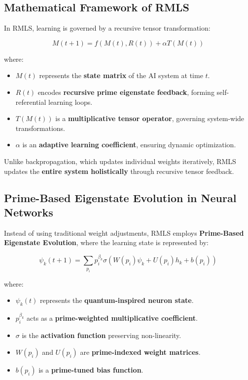 \documentclass{article}
\theoremstyle{plain}
\theoremstyle{plain}
\theoremstyle{definition}
\theoremstyle{remark}
\begin{document}
\subsection{Mathematical Framework of RMLS}

In RMLS, learning is governed by a recursive tensor transformation:

\begin{equation}
M(t+1) = f(M(t), R(t)) + \alpha T(M(t))
\end{equation}

where:
\begin{itemize}
    \item $M(t)$ represents the \textbf{state matrix} of the AI system at time $t$.
    \item $R(t)$ encodes \textbf{recursive prime eigenstate feedback}, forming self-referential learning loops.
    \item $T(M(t))$ is a \textbf{multiplicative tensor operator}, governing system-wide transformations.
    \item $\alpha$ is an \textbf{adaptive learning coefficient}, ensuring dynamic optimization.
\end{itemize}

Unlike backpropagation, which updates individual weights iteratively, RMLS updates the \textbf{entire system holistically} through recursive tensor feedback.

\subsection{Prime-Based Eigenstate Evolution in Neural Networks}

Instead of using traditional weight adjustments, RMLS employs \textbf{Prime-Based Eigenstate Evolution}, where the learning state is represented by:

\begin{equation}
\psi_k (t+1) = \sum_{p_i} p_i^{\beta_k} \sigma (W(p_i) \psi_k + U(p_i) h_k + b(p_i))
\end{equation}

where:
\begin{itemize}
    \item $\psi_k (t)$ represents the \textbf{quantum-inspired neuron state}.
    \item $p_i^{\beta_k}$ acts as a \textbf{prime-weighted multiplicative coefficient}.
    \item $\sigma$ is the \textbf{activation function} preserving non-linearity.
    \item $W(p_i)$ and $U(p_i)$ are \textbf{prime-indexed weight matrices}.
    \item $b(p_i)$ is a \textbf{prime-tuned bias function}.
\end{itemize}
\end{document}
